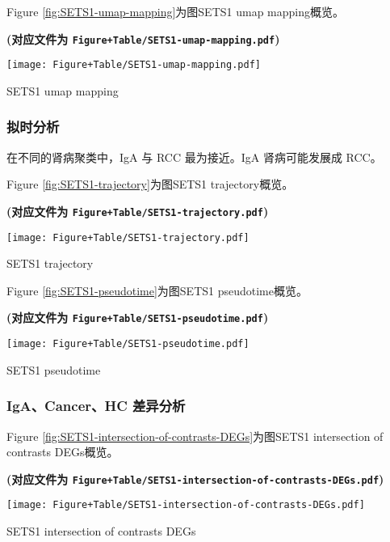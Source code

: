 \documentclass[
]{article}
\begin{document}
Figure \ref{fig:SETS1-umap-mapping}为图SETS1 umap mapping概览。

\textbf{(对应文件为 \texttt{Figure+Table/SETS1-umap-mapping.pdf})}

\def\@captype{figure}
\begin{center}
\texttt{[image: Figure+Table/SETS1-umap-mapping.pdf]}
\caption{SETS1 umap mapping}\label{fig:SETS1-umap-mapping}
\end{center}

\hypertarget{ux62dfux65f6ux5206ux6790}{%
\subsubsection{拟时分析}\label{ux62dfux65f6ux5206ux6790}}

在不同的肾病聚类中，IgA 与 RCC 最为接近。IgA 肾病可能发展成 RCC。

Figure \ref{fig:SETS1-trajectory}为图SETS1 trajectory概览。

\textbf{(对应文件为 \texttt{Figure+Table/SETS1-trajectory.pdf})}

\def\@captype{figure}
\begin{center}
\texttt{[image: Figure+Table/SETS1-trajectory.pdf]}
\caption{SETS1 trajectory}\label{fig:SETS1-trajectory}
\end{center}

Figure \ref{fig:SETS1-pseudotime}为图SETS1 pseudotime概览。

\textbf{(对应文件为 \texttt{Figure+Table/SETS1-pseudotime.pdf})}

\def\@captype{figure}
\begin{center}
\texttt{[image: Figure+Table/SETS1-pseudotime.pdf]}
\caption{SETS1 pseudotime}\label{fig:SETS1-pseudotime}
\end{center}

\hypertarget{igacancerhc-ux5deeux5f02ux5206ux6790}{%
\subsubsection{IgA、Cancer、HC 差异分析}\label{igacancerhc-ux5deeux5f02ux5206ux6790}}

Figure \ref{fig:SETS1-intersection-of-contrasts-DEGs}为图SETS1 intersection of contrasts DEGs概览。

\textbf{(对应文件为 \texttt{Figure+Table/SETS1-intersection-of-contrasts-DEGs.pdf})}

\def\@captype{figure}
\begin{center}
\texttt{[image: Figure+Table/SETS1-intersection-of-contrasts-DEGs.pdf]}
\caption{SETS1 intersection of contrasts DEGs}\label{fig:SETS1-intersection-of-contrasts-DEGs}
\end{center}
\end{document}
